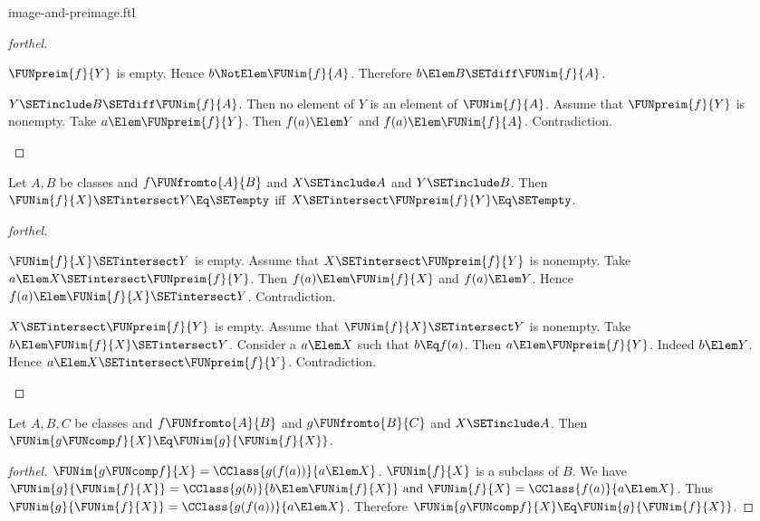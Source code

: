 \documentclass{stex}
\begin{document}
\begin{smodule}{image-and-preimage.ftl}
\begin{proof}[forthel]
\begin{case}{$\FUNpreim{f}{Y}$ is empty.}
    Hence $b \NotElem \FUNim{f}{A}$.
    Therefore $b \Elem B \SETdiff \FUNim{f}{A}$.
  \end{case}

  \begin{case}{$Y \SETinclude B \SETdiff \FUNim{f}{A}$.}
    Then no element of $Y$ is an element of $\FUNim{f}{A}$.
    Assume that $\FUNpreim{f}{Y}$ is nonempty.
    Take $a \Elem \FUNpreim{f}{Y}$.
    Then $f(a) \Elem Y$ and $f(a) \Elem \FUNim{f}{A}$.
    Contradiction.
  \end{case}
\end{proof}

\begin{proposition}[forthel]
  Let $A, B$ be classes and $f \FUNfromto{A}{B}$ and $X \SETinclude A$ and $Y \SETinclude B$.
  Then $\FUNim{f}{X} \SETintersect Y \Eq \SETempty$ iff $X \SETintersect \FUNpreim{f}{Y} \Eq \SETempty$.
\end{proposition}
\begin{proof}[forthel]
  \begin{case}{$\FUNim{f}{X} \SETintersect Y$ is empty.}
    Assume that $X \SETintersect \FUNpreim{f}{Y}$ is nonempty.
    Take $a \Elem X \SETintersect \FUNpreim{f}{Y}$.
    Then $f(a) \Elem \FUNim{f}{X}$ and $f(a) \Elem Y$.
    Hence $f(a) \Elem \FUNim{f}{X} \SETintersect Y$.
    Contradiction.
  \end{case}

  \begin{case}{$X \SETintersect \FUNpreim{f}{Y}$ is empty.}
    Assume that $\FUNim{f}{X} \SETintersect Y$ is nonempty.
    Take $b \Elem \FUNim{f}{X} \SETintersect Y$.
    Consider a $a \Elem X$ such that $b \Eq f(a)$.
    Then $a \Elem \FUNpreim{f}{Y}$.
    Indeed $b \Elem Y$.
    Hence $a \Elem X \SETintersect \FUNpreim{f}{Y}$.
    Contradiction.
  \end{case}
\end{proof}

\begin{proposition}[forthel]
  Let $A, B, C$ be classes and $f \FUNfromto{A}{B}$ and $g \FUNfromto{B}{C}$ and $X \SETinclude A$.
  Then $\FUNim{g \FUNcomp f}{X} \Eq \FUNim{g}{\FUNim{f}{X}}$.
\end{proposition}
\begin{proof}[forthel]
  $\FUNim{g \FUNcomp f}{X} = \CClass{g(f(a))}{a \Elem X}$.
  $\FUNim{f}{X}$ is a subclass of $B$.
  We have $\FUNim{g}{\FUNim{f}{X}} = \CClass{g(b)}{b \Elem \FUNim{f}{X}}\text{ and }\FUNim{f}{X} = \CClass{f(a)}{a \Elem X}$.
  Thus $\FUNim{g}{\FUNim{f}{X}} = \CClass{g(f(a))}{a \Elem X}$.
  Therefore $\FUNim{g \FUNcomp f}{X} \Eq \FUNim{g}{\FUNim{f}{X}}$.
\end{proof}


\end{smodule}
\end{document}
